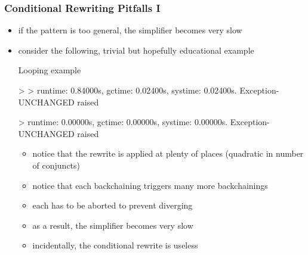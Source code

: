 \begin{frame}[fragile]
\frametitle{Conditional Rewriting Pitfalls I}

\begin{itemize}
\item if the pattern is too general, the simplifier becomes very slow
\item consider the following, trivial but hopefully educational example
\begin{minipage}{.85\textwidth}
\begin{exampleblock}{Looping example}
\begin{semiverbatim}\scriptsize
> 
> 
runtime: 0.84000s,    gctime: 0.02400s,     systime: 0.02400s.
Exception- UNCHANGED raised

> 
runtime: 0.00000s,    gctime: 0.00000s,     systime: 0.00000s.
Exception- UNCHANGED raised
\end{semiverbatim}
\end{exampleblock}
\end{minipage}
\begin{itemize}
\item notice that the rewrite is applied at plenty of places (quadratic in number of conjuncts)
\item notice that each backchaining triggers many more backchainings
\item each has to be aborted to prevent diverging
\item as a result, the simplifier becomes very slow
\item incidentally, the conditional rewrite is useless
\end{itemize}
\end{itemize}
\end{frame}



